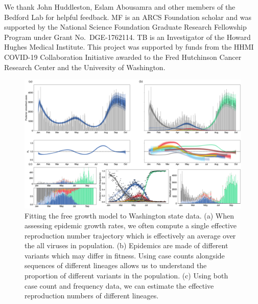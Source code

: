 \documentclass[11pt,oneside,letterpaper]{article}
\begin{document}
We thank John Huddleston, Eslam Abousamra and other members of the Bedford Lab for helpful feedback.
MF is an ARCS Foundation scholar and was supported by the National Science Foundation Graduate Research Fellowship Program under Grant No.\ DGE-1762114.
TB is an Investigator of the Howard Hughes Medical Institute.
This project was supported by funds from the HHMI COVID-19 Collaboration Initiative awarded to the Fred Hutchinson Cancer Research Center and the University of Washington.

\begin{figure}
  \centering
  \includegraphics[width=\linewidth]{figs/fig_1.png}
  \caption{ Fitting the free growth model to Washington state data.
    (a) When assessing epidemic growth rates, we often compute a single effective reproduction number trajectory which is effectively an average over the all viruses in population.
    (b) Epidemics are made of different variants which may differ in fitness. Using case counts alongside sequences of different lineages allows us to understand the proportion of different variants in the population.
(c) Using both case count and frequency data, we can estimate the effective reproduction numbers of different lineages.}%
  \label{fig:1}
\end{figure}
\end{document}
